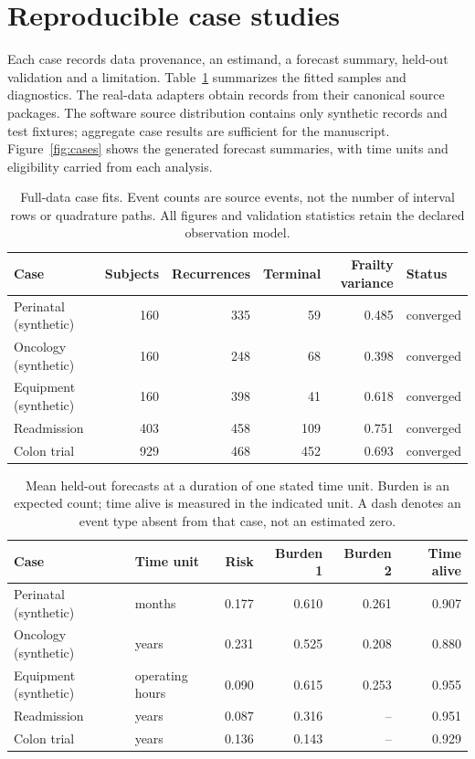 \documentclass[article,nojss]{jss}
\begin{document}
\section{Reproducible case studies}\label{sec:cases}
Each case records data provenance, an estimand, a forecast summary, held-out validation and a limitation. Table~\ref{tab:cases} summarizes the fitted samples and diagnostics. The real-data adapters obtain records from their canonical source packages. The software source distribution contains only synthetic records and test fixtures; aggregate case results are sufficient for the manuscript. Figure~\ref{fig:cases} shows the generated forecast summaries, with time units and eligibility carried from each analysis.
\begin{table}[tbp]
\centering\small
\begin{tabular}{lrrrrl}
\toprule
Case & Subjects & Recurrences & Terminal & Frailty variance & Status \\
\midrule
Perinatal (synthetic) & 160 & 335 & 59 & 0.485 & converged \\
Oncology (synthetic) & 160 & 248 & 68 & 0.398 & converged \\
Equipment (synthetic) & 160 & 398 & 41 & 0.618 & converged \\
Readmission & 403 & 458 & 109 & 0.751 & converged \\
Colon trial & 929 & 468 & 452 & 0.693 & converged \\
\bottomrule
\end{tabular}
\caption{Full-data case fits. Event counts are source events, not the number of interval rows or quadrature paths. All figures and validation statistics retain the declared observation model.}\label{tab:cases}
\end{table}

\begin{table}[tbp]
\centering\small
\begin{tabular}{llrrrr}
\toprule
Case & Time unit & Risk & Burden 1 & Burden 2 & Time alive \\
\midrule
Perinatal (synthetic) & months & 0.177 & 0.610 & 0.261 & 0.907 \\
Oncology (synthetic) & years & 0.231 & 0.525 & 0.208 & 0.880 \\
Equipment (synthetic) & operating hours & 0.090 & 0.615 & 0.253 & 0.955 \\
Readmission & years & 0.087 & 0.316 & -- & 0.951 \\
Colon trial & years & 0.136 & 0.143 & -- & 0.929 \\
\bottomrule
\end{tabular}
\caption{Mean held-out forecasts at a duration of one stated time unit. Burden is an expected count; time alive is measured in the indicated unit. A dash denotes an event type absent from that case, not an estimated zero.}\label{tab:caseforecasts}
\end{table}
\end{document}
